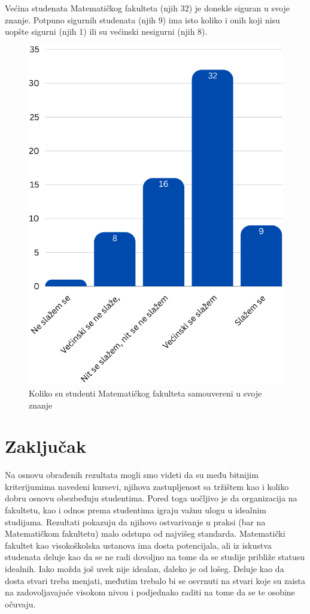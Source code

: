 \documentclass[a4paper]{article}
\begin{document}
{Većina studenata Matematičkog fakulteta (njih 32) je donekle siguran u svoje znanje. Potpuno sigurnih studenata (njih 9) ima isto koliko i onih koji nisu uopšte sigurni (njih 1) ili su većinski nesigurni (njih 8).
\begin{figure}[h!]
\begin{center}
    \includegraphics[scale = 0.3]{SamouverenostStudenataMatf.png}
    \caption{Koliko su studenti Matematičkog fakulteta samouvereni u svoje znanje}
    \label{fig:samouverenost_matf}
\end{center}
\end{figure}


\section{Zaključak}
\label{sec:zakljucak}

Na osnovu obrađenih rezultata mogli smo videti da su među bitnijim kriterijumima navedeni kursevi, njihova zastupljenost sa tržištem kao i koliko dobru osnovu obezbeđuju studentima. Pored toga uočljivo je da organizacija na fakultetu, kao i odnos prema studentima igraju važnu ulogu u idealnim studijama. Rezultati pokazuju da njihovo ostvarivanje u praksi (bar na Matematičkom fakultetu) malo odstupa od najvišeg standarda. Matematički fakultet kao visokoškolska ustanova ima dosta potencijala, ali iz iskustva studenata deluje kao da se ne radi dovoljno na tome da se studije približe statusu idealnih. Iako možda još uvek nije idealan, daleko je od lošeg. Deluje kao da dosta stvari treba menjati, međutim trebalo bi se osvrnuti na stvari koje su zaista na zadovoljavajuće visokom nivou i podjednako raditi na tome da se te osobine očuvaju.  


}
\end{document}
